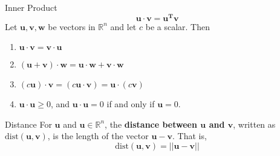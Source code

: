 \pagebreak
{}
\begin{defbox}{Inner Product}
    \[
        \mathbf{u \cdot v = u^Tv}
    \]
    Let $\mathbf{u}, \mathbf{v}, \mathbf{w}$ be vectors in $\mathbb{R}^n$ and let $c$ be a scalar. Then
    \begin{enumerate}
        \item $\mathbf{u \cdot v} = \mathbf{v \cdot u}$
        \item $(\mathbf{u} + \mathbf{v}) \cdot \mathbf{w} = \mathbf{u} \cdot \mathbf{w} + \mathbf{v} \cdot \mathbf{w}$
        \item $(c\mathbf{u}) \cdot \mathbf{v} = (c\mathbf{u \cdot v}) = \mathbf{u} \cdot (c\mathbf{v})$ 
        \item $\mathbf{u \cdot u} \geq 0$, and $\mathbf{u \cdot u} = 0$ if and only if $\mathbf{u} = 0$.
    \end{enumerate}
\end{defbox}
\begin{defbox}{Distance}
    For $\mathbf{u}$ and $\mathbf{u} \in \mathbb{R}^n$, the \textbf{distance between $\mathbf{u}$ and $\mathbf{v}$}, written as $\text{dist}(\mathbf{u}, \mathbf{v})$, is the length of the vector $\mathbf{u} - \mathbf{v}$. That is,
    \[
        \text{dist}(\mathbf{u}, \mathbf{v}) = ||\mathbf{u} - \mathbf{v}||
    \]
\end{defbox}
